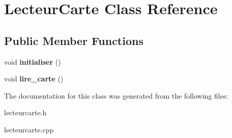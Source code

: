\hypertarget{classLecteurCarte}{}\section{Lecteur\+Carte Class Reference}
\label{classLecteurCarte}
\subsection*{Public Member Functions}
\begin{DoxyCompactItemize}
\item 
\mbox{\label{classLecteurCarte_a723859d389df0d286a553d39ec77a11f}} 
void {\bfseries initialiser} ()
\item 
\mbox{\label{classLecteurCarte_a90e4f75fb492935ebaf5f908173763af}} 
void {\bfseries lire\+\_\+carte} ()
\end{DoxyCompactItemize}


The documentation for this class was generated from the following files\+:\begin{DoxyCompactItemize}
\item 
lecteurcarte.\+h\item 
lecteurcarte.\+cpp\end{DoxyCompactItemize}
